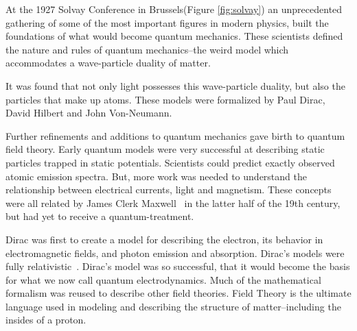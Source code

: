 At the 1927 Solvay Conference in Brussels(Figure \ref{fig:solvay}) an
unprecedented gathering of some of the most important figures in modern physics,
built the foundations of what would become quantum mechanics. These scientists
defined the nature and rules of quantum mechanics--the weird model which
accommodates a wave-particle duality of matter. 

It was found that not only light possesses this wave-particle duality, but also
the particles that make up atoms. These models were formalized by Paul Dirac,
David Hilbert and John Von-Neumann.

Further refinements and additions to quantum mechanics gave birth to quantum
field theory. Early quantum models were very successful at describing static
particles trapped in static potentials. Scientists could predict exactly
observed atomic emission spectra. But, more work was needed to understand the
relationship between electrical currents, light and magnetism.  These concepts
were all related by James Clerk Maxwell~\cite{Maxwell1865} in the latter half of
the 19th century, but had yet to receive a quantum-treatment.

Dirac was first to create a model for describing the electron, its behavior in
electromagnetic fields, and photon emission and absorption. Dirac's models were
fully relativistic~\cite{Dirac}. Dirac's model was so successful, that it would
become the basis for what we now call quantum electrodynamics.  Much of the
mathematical formalism was reused to describe other field theories. Field Theory
is the ultimate language used in modeling and describing the structure of
matter--including the insides of a proton. 

